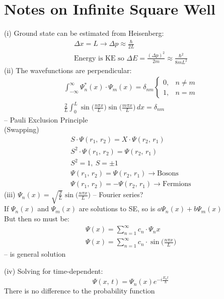 \documentclass[a4paper, 11pt, fleqn, normalem]{report}
\begin{document}
\section{Notes on Infinite Square Well}
(i) Ground state can be estimated from Heisenberg:
\begin{gather*}
    \Delta x = L \rightarrow \Delta p \approx \frac{\hbar}{2L} \\
    \text{Energy is KE so }\Delta E = \frac{(\Delta p)^{2}}{2m} \approx \frac{\hbar^{2}}{8mL^{2}}
\end{gather*}
(ii) The wavefunctions are perpendicular:
\begin{gather*}
    \int_{-\infty}^{\infty} \Psi_{n}^{\ast}(x)\cdot\Psi_{m}(x) = \delta_{nm}
    \begin{cases}
        0, & n \neq m \\
        1, & n = m
    \end{cases} \\
    \frac{2}{L}\int_{0}^{L}\sin\Big(\frac{n\pi x}{L}\Big)\sin\Big(\frac{m\pi x}{L}\Big)\,dx = \delta_{nm}
\end{gather*}
-- Pauli Exclusion Principle \\
(Swapping)
\begin{gather*}
    S\cdot\Psi(r_{1},\,r_{2}) = X\cdot\Psi(r_{2},\,r_{1}) \\
    S^{2}\cdot\Psi(r_{1},\,r_{2}) = \Psi(r_{2},\,r_{1}) \\
    S^{2} = 1,~S = \pm 1 \\
    \Psi(r_{1},\,r_{2}) = \Psi(r_{2},\,r_{1}) \rightarrow \text{Bosons} \\
    \Psi(r_{1},\,r_{2}) = -\Psi(r_{2},\,r_{1}) \rightarrow \text{Fermions}
\end{gather*}
(iii) $\Psi_{n}(x) = \sqrt{\frac{2}{L}}\sin\Big(\frac{n\pi x}{L}\Big)$ -- Fourier series? \\
If $\Psi_{n}(x)$ and $\Psi_{m}(x)$ are solutions to SE, so is $a\Psi_{n}(x) + b\Psi_{m}(x)$ \\
But then so must be:
\begin{gather*}
    \Psi(x) = \sum_{n = 1}^{\infty} c_{n}\cdot\Psi_{n}{x} \\
    \Psi(x) = \sum_{n = 1}^{\infty} c_{n}\cdot\sin\Big(\frac{n\pi x}{L}\Big)
\end{gather*}
-- is general solution

(iv) Solving for time-dependent:
\begin{equation*}
    \Psi(x,\,t) = \Psi_{n}(x)e^{-i\tfrac{E_{n}t}{\hbar}}
\end{equation*}
There is no difference to the probability function
\end{document}
